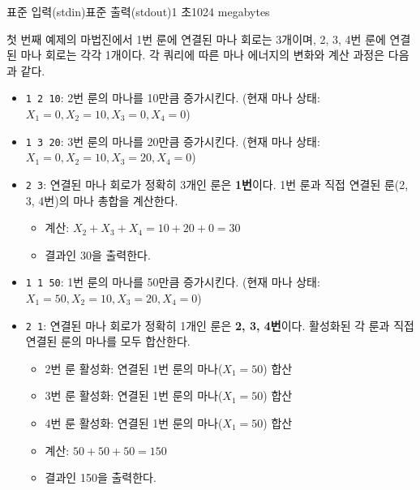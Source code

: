 \begin{problem}{\probtitle}{표준 입력(stdin)}{표준 출력(stdout)}{1 초}{1024 megabytes}
\Example 
\begin{example} 
\end{example} 

\newpage
\Notes 
\begin{center} 
\end{center} 
첫 번째 예제의 마법진에서 1번 룬에 연결된 마나 회로는 3개이며, 2, 3, 4번 룬에 연결된 마나 회로는 각각 1개이다. 각 쿼리에 따른 마나 에너지의 변화와 계산 과정은 다음과 같다. 

\begin{itemize}[topsep=0pt,noitemsep] 
    \item \texttt{1 2 10}: 2번 룬의 마나를 10만큼 증가시킨다. (현재 마나 상태: $X_1=0, X_2=10, X_3=0, X_4=0$) 
    \item \texttt{1 3 20}: 3번 룬의 마나를 20만큼 증가시킨다. (현재 마나 상태: $X_1=0, X_2=10, X_3=20, X_4=0$) 
    \item \texttt{2 3}: 연결된 마나 회로가 정확히 3개인 룬은 \textbf{1번}이다. 1번 룬과 직접 연결된 룬(2, 3, 4번)의 마나 총합을 계산한다. 
    \begin{itemize}[topsep=0pt,noitemsep] 
        \item 계산: $X_2 + X_3 + X_4 = 10 + 20 + 0 = 30$ 
        \item 결과인 30을 출력한다. 
    \end{itemize} 
    \item \texttt{1 1 50}: 1번 룬의 마나를 50만큼 증가시킨다. (현재 마나 상태: $X_1=50, X_2=10, X_3=20, X_4=0$) 
    \item \texttt{2 1}: 연결된 마나 회로가 정확히 1개인 룬은 \textbf{2, 3, 4번}이다. 활성화된 각 룬과 직접 연결된 룬의 마나를 모두 합산한다. 
    \begin{itemize}[topsep=0pt,noitemsep] 
        \item 2번 룬 활성화: 연결된 1번 룬의 마나($X_1=50$) 합산 
        \item 3번 룬 활성화: 연결된 1번 룬의 마나($X_1=50$) 합산 
        \item 4번 룬 활성화: 연결된 1번 룬의 마나($X_1=50$) 합산 
        \item 계산: $50 + 50 + 50 = 150$ 
        \item 결과인 150을 출력한다. 
    \end{itemize}
\end{itemize} 
\end{problem}
